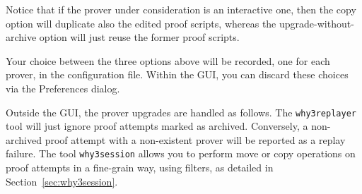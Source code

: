Notice that if the prover under consideration is an interactive one, then
the copy option will duplicate also the edited proof scripts, whereas
the upgrade-without-archive option will just reuse the former proof scripts.

Your choice between the three options above will be recorded, one for
each prover, in the \why configuration file. Within the GUI, you can
discard these choices via the \textsf{Preferences} dialog.

Outside the GUI, the prover upgrades are handled as follows. The
\texttt{why3replayer} tool will just ignore proof attempts marked as
archived. Conversely, a non-archived proof attempt with a non-existent
prover will be reported as a replay failure. The tool
\texttt{why3session} allows you to perform move or copy operations on
proof attempts in a fine-grain way, using filters, as detailed in
Section~\ref{sec:why3session}.




